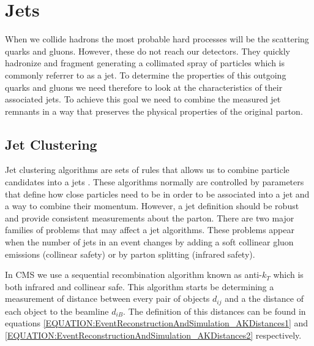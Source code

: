 \section{Jets}
\label{SECTION:EventReconstructionAndSimulation_Jets}


When we collide hadrons the most probable hard processes will be the scattering quarks and gluons. However, these do not reach our detectors. They quickly hadronize and fragment generating a collimated spray of particles which is commonly referrer to as a jet. To determine the properties of this outgoing quarks and gluons we need therefore to look at the characteristics of their associated jets. To achieve this goal we need to combine the measured jet remnants in a way that preserves the physical properties of the original parton.

\subsection{Jet Clustering}
\label{SECTION:EventReconstructionAndSimulation_Jets_JetClustering}


Jet clustering algorithms are sets of rules that allows us to combine particle candidates into a jets \cite{ARTICLE:TowardsJetography}. These algorithms normally are controlled by parameters that define how close particles need to be in order to be associated into a jet and a way to combine their momentum. However, a jet definition should be robust and provide consistent measurements about the parton. There are two major families of problems that may affect a jet algorithms. These problems appear when the number of jets in an event changes by adding a soft collinear gluon emissions (collinear safety) or by parton splitting (infrared safety). 

In \gls{CMS} we use a sequential recombination algorithm known as anti-$k_T$ \cite{ARTICLE:AntiKtAlgorithm} which is both infrared and collinear safe. This algorithm starts be determining a measurement of distance between every pair of objects $d_{ij}$ and a the distance of each object to the beamline $d_{iB}$. The definition of this distances can be found in equations \ref{EQUATION:EventReconstructionAndSimulation_AKDistances1} and \ref{EQUATION:EventReconstructionAndSimulation_AKDistances2} respectively. 

